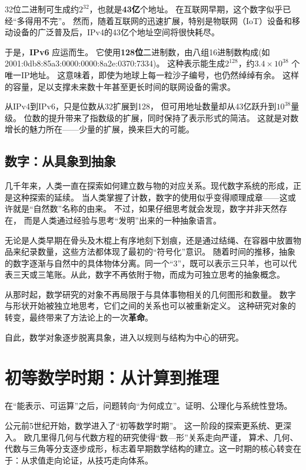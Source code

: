32位二进制可生成约$2^{32}$，也就是{\bf 43亿}个地址。  
在互联网早期，这个数字似乎已经“多得用不完”。  
然而，随着互联网的迅速扩展，特别是物联网（IoT）设备和移动设备的广泛普及后，IPv4的43亿个地址空间将很快耗尽。  

于是，{\bf IPv6} 应运而生。  
它使用{\bf 128位}二进制数，由八组16进制数构成(如 2001:0db8:85a3:0000:0000:8a2e:0370:7334)。
这种表示能生成$2^{128}$，约{\bf $3.4 \times 10^{38} $} 个唯一IP地址。  
这意味着，即使为地球上每一粒沙子编号，也仍然绰绰有余。  
这样的容量，足以支撑未来数十年甚至更长时间的联网设备的需求。 

从IPv4到IPv6，只是位数从32扩展到128，  
但可用地址数量却从43亿跃升到$10^{38}$量级。  
位数的提升带来了指数级的扩展，同时保持了表示形式的简洁。  
这就是对数增长的魅力所在——少量的扩展，换来巨大的可能。  

\subsection{数字：从具象到抽象}

几千年来，人类一直在探索如何建立数与物的对应关系。现代数字系统的形成，正是这种探索的延续。
当人类掌握了计数，数字的使用似乎变得顺理成章——这或许就是“自然数”名称的由来。  
不过，如果仔细思考就会发现，数字并非天然存在，  
而是人类通过经验与思考“发明”出来的一种抽象语言。

无论是人类早期在骨头及木棍上有序地刻下划痕，还是通过结绳、在容器中放置物品来纪录数量，这些方法都体现了最初的“符号化”意识。 
随着时间的推移，抽象的数字逐渐与自然中的具体物体分离。同一个“3”，既可以表示三只羊，也可以代表三天或三笔账。从此，数字不再依附于物，而成为可独立思考的抽象概念。

从那时起，数学研究的对象不再局限于与具体事物相关的几何图形和数量。 
数字与形状开始被独立地思考，它们之间的关系也可以被重新定义。  
这种研究对象的转变，最终带来了方法论上的一次{\bf 革命}。

自此，数学对象逐步脱离具象，进入以规则与结构为中心的研究。

\section{初等数学时期：从计算到推理}

在“能表示、可运算”之后，问题转向“为何成立”。证明、公理化与系统性登场。

公元前5世纪开始，数学进入了“初等数学时期”。  
这一阶段的探索更系统、更深入。
欧几里得几何与代数方程的研究使得“数—形”关系走向严谨，  
算术、几何、代数与三角等分支逐步成形，标志着早期数学结构的建立。这一时期的核心转变在于：从求值走向论证，从技巧走向体系。

